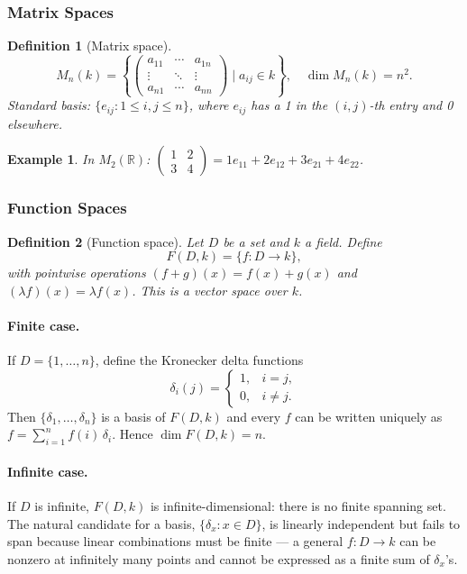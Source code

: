 \documentclass{article}
\newtheorem{definition}{Definition}
\newtheorem*{example}{Example}
\begin{document}
\subsubsection{Matrix Spaces}
\begin{definition}[Matrix space]
    \[M_n(k) = \left\{\begin{pmatrix}a_{11}&\cdots&a_{1n}\\\vdots&\ddots&\vdots\\a_{n1}&\cdots&a_{nn}\end{pmatrix}\mid a_{ij}\in k\right\}, \quad \dim M_n(k) = n^2.\]
    Standard basis: $\{e_{ij} : 1\le i,j\le n\}$, where $e_{ij}$ has a 1 in the $(i,j)$-th entry and 0 elsewhere.
\end{definition}
\begin{example}
    In $M_2(\mathbb{R})$: $\begin{pmatrix}1&2\\3&4\end{pmatrix} = 1e_{11}+2e_{12}+3e_{21}+4e_{22}$.
\end{example}

\subsubsection{Function Spaces}
\begin{definition}[Function space]
    Let $D$ be a set and $k$ a field. Define
    \[F(D,k) = \{f : D \to k\},\]
    with pointwise operations $(f+g)(x)=f(x)+g(x)$ and $(\lambda f)(x)=\lambda f(x)$. This is a vector space over $k$.
\end{definition}

\paragraph{Finite case.} If $D=\{1,\ldots,n\}$, define the Kronecker delta functions
\[\delta_i(j) = \begin{cases}1, & i=j,\\ 0, & i\ne j.\end{cases}\]
Then $\{\delta_1,\ldots,\delta_n\}$ is a basis of $F(D,k)$ and every $f$ can be written uniquely as $f = \sum_{i=1}^n f(i)\,\delta_i$. Hence $\dim F(D,k) = n$.

\paragraph{Infinite case.} If $D$ is infinite, $F(D,k)$ is infinite-dimensional: there is no finite spanning set. The natural candidate for a basis, $\{\delta_x : x\in D\}$, is linearly independent but fails to span because linear combinations must be finite --- a general $f: D \to k$ can be nonzero at infinitely many points and cannot be expressed as a finite sum of $\delta_x$'s.
\end{document}
